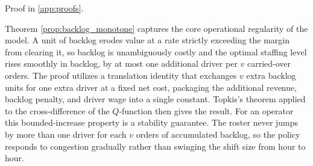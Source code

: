 \documentclass[preprint,11pt,authoryear]{elsarticle}
\newcommand{\bvec}[1]{\mathbf{#1}}
\theoremstyle{remark}
\begin{document}
Proof in \ref{app:proofs}.

Theorem \ref{prop:backlog_monotone} captures the core operational regularity of the model. A unit of backlog erodes value at a rate strictly exceeding the margin from clearing it, so backlog is unambiguously costly and the optimal staffing level rises smoothly in backlog, by at most one additional driver per $v$ carried-over orders. The proof utilizes a translation identity that exchanges $v$ extra backlog units for one extra driver at a fixed net cost, packaging the additional revenue, backlog penalty, and driver wage into a single constant. Topkis's theorem applied to the cross-difference of the $Q$-function then gives the result. For an operator this bounded-increase property is a stability guarantee. The roster never jumps by more than one driver for each $v$ orders of accumulated backlog, so the policy responds to congestion gradually rather than swinging the shift size from hour to hour.

\end{document}
